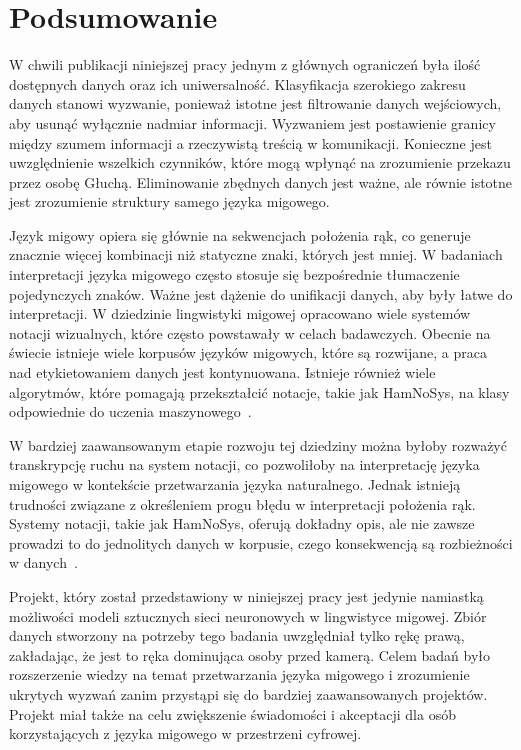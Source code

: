 \hypersetup{pageanchor=true}

\chapter{Podsumowanie}\label{ch:summary}

W chwili publikacji niniejszej pracy jednym z głównych ograniczeń była ilość dostępnych danych oraz ich uniwersalność. Klasyfikacja szerokiego zakresu danych stanowi wyzwanie, ponieważ istotne jest filtrowanie danych wejściowych, aby usunąć wyłącznie nadmiar informacji. Wyzwaniem jest postawienie granicy między szumem informacji a rzeczywistą treścią w komunikacji. Konieczne jest uwzględnienie wszelkich czynników, które mogą wpłynąć na zrozumienie przekazu przez osobę Głuchą. Eliminowanie zbędnych danych jest ważne, ale równie istotne jest zrozumienie struktury samego języka migowego.

Język migowy opiera się głównie na sekwencjach położenia rąk, co generuje znacznie więcej kombinacji niż statyczne znaki, których jest mniej. W badaniach interpretacji języka migowego często stosuje się bezpośrednie tłumaczenie pojedynczych znaków. Ważne jest dążenie do unifikacji danych, aby były łatwe do interpretacji. W dziedzinie lingwistyki migowej opracowano wiele systemów notacji wizualnych, które często powstawały w celach badawczych. Obecnie na świecie istnieje wiele korpusów języków migowych, które są rozwijane, a praca nad etykietowaniem danych jest kontynuowana. Istnieje również wiele algorytmów, które pomagają przekształcić notacje, takie jak HamNoSys, na klasy odpowiednie do uczenia maszynowego~\cite{majchrowska2022}.

W bardziej zaawansowanym etapie rozwoju tej dziedziny można byłoby rozważyć transkrypcję ruchu na system notacji, co pozwoliłoby na interpretację języka migowego w kontekście przetwarzania języka naturalnego. Jednak istnieją trudności związane z określeniem progu błędu w interpretacji położenia rąk. Systemy notacji, takie jak HamNoSys, oferują dokładny opis, ale nie zawsze prowadzi to do jednolitych danych w korpusie, czego konsekwencją są rozbieżności w danych~\cite{ferlin2023}.

Projekt, który został przedstawiony w niniejszej pracy jest jedynie namiastką możliwości modeli sztucznych sieci neuronowych w lingwistyce migowej. Zbiór danych stworzony na potrzeby tego badania uwzględniał tylko rękę prawą, zakładając, że jest to ręka dominująca osoby przed kamerą. Celem badań było rozszerzenie wiedzy na temat przetwarzania języka migowego i zrozumienie ukrytych wyzwań zanim przystąpi się do bardziej zaawansowanych projektów. Projekt miał także na celu zwiększenie świadomości i akceptacji dla osób korzystających z języka migowego w przestrzeni cyfrowej.
